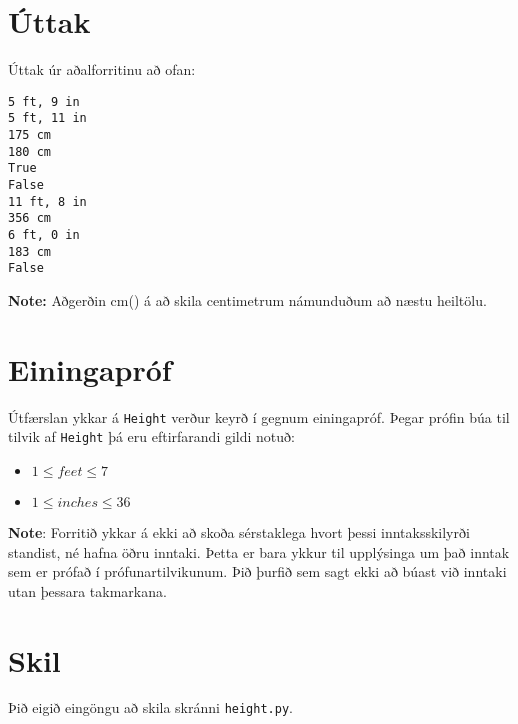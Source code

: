 \section*{Úttak}
\noindent
Úttak úr aðalforritinu að ofan:
\begin{verbatim}
5 ft, 9 in
5 ft, 11 in
175 cm
180 cm
True
False
11 ft, 8 in
356 cm
6 ft, 0 in
183 cm
False
\end{verbatim}
\textbf{Note:} Aðgerðin cm() á að skila centimetrum námunduðum að næstu heiltölu.

\section*{Einingapróf}
Útfærslan ykkar á \texttt{Height} verður keyrð í gegnum einingapróf.
Þegar prófin búa til tilvik af \texttt{Height} þá eru eftirfarandi gildi notuð:
\begin{itemize}
\item $1 \le feet \le 7$
\item $1 \le inches \le 36$ 
\end{itemize}

\textbf{Note}: Forritið ykkar á ekki að skoða sérstaklega hvort þessi inntaksskilyrði standist, né hafna öðru inntaki. 
Þetta er bara ykkur til upplýsinga um það inntak sem er prófað í prófunartilvikunum. 
Þið þurfið sem sagt ekki að búast við inntaki utan þessara takmarkana.

\section*{Skil}
Þið eigið eingöngu að skila skránni \texttt{height.py}.
